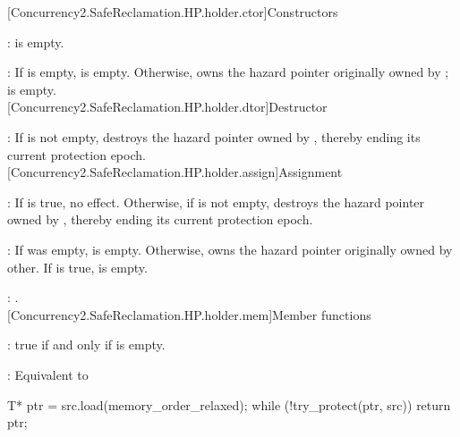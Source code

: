 [Concurrency2.SafeReclamation.HP.holder.ctor]{Constructors}


\pnum
{}:  is empty.
\\


\pnum
{}: If  is empty,  is empty. Otherwise,  owns the hazard pointer originally owned by ;  is empty.
\\

[Concurrency2.SafeReclamation.HP.holder.dtor]{Destructor}


\pnum
{}: If  is not empty, destroys the hazard pointer owned by , thereby ending its current protection epoch.
\\

[Concurrency2.SafeReclamation.HP.holder.assign]{Assignment}


\pnum
{}: If  is true, no effect. Otherwise, if  is not empty, destroys
the hazard pointer owned by , thereby ending its current protection epoch.

\pnum
{}: If  was empty,  is empty. Otherwise,  owns the hazard
pointer originally owned by other. If  is true,  is empty.

\pnum
{}: .
\\

[Concurrency2.SafeReclamation.HP.holder.mem]{Member functions}


\pnum
{}: true if and only if  is empty.
\\


\pnum
{}: Equivalent to
\begin{codeblock}
T* ptr = src.load(memory_order_relaxed);
while (!try_protect(ptr, src)) {}
return ptr;
\end{codeblock}

